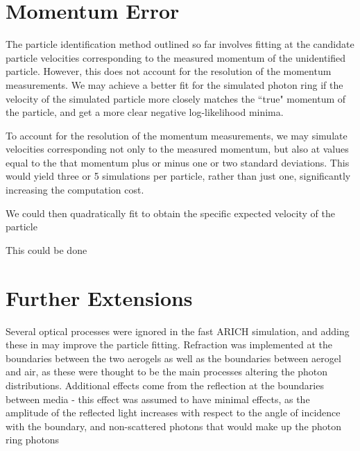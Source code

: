 \section{Momentum Error}
The particle identification method outlined so far involves fitting at the candidate particle velocities corresponding to the measured momentum of the unidentified particle.
However, this does not account for the resolution of the momentum measurements.
We may achieve a better fit for the simulated photon ring if the velocity of the simulated particle more closely matches the ``true" momentum of the particle, and get a more clear negative log-likelihood minima. 

To account for the resolution of the momentum measurements, we may simulate velocities corresponding not only to the measured momentum, but also at values equal to the that momentum plus or minus one or two standard deviations.
This would yield three or 5 simulations per particle, rather than just one, significantly increasing the computation cost. 

We could then quadratically fit to obtain the specific expected velocity of the particle

This could be done


\section{Further Extensions}
Several optical processes were ignored in the fast ARICH simulation, and adding these in may improve the particle fitting. 
Refraction was implemented at the boundaries between the two aerogels as well as the boundaries between aerogel and air, as these were thought to be the main processes altering the photon distributions.
Additional effects come from the reflection at the boundaries between media - this effect was assumed to have minimal effects, as the amplitude of the reflected light increases with respect to the angle of incidence with the boundary, and non-scattered photons that would make up the photon ring photons   



\endinput 

Any text after an \endinput is ignored.
You could put scraps here or things in progress.
